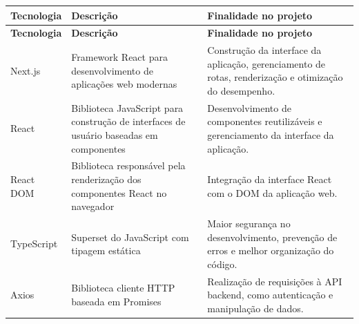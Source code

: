 \documentclass[12pt]{article}
\begin{document}
\begin{longtable}{|p{3cm}|p{4.2cm}|p{7cm}|}
  \hline
  \textbf{Tecnologia}                                                                    & \textbf{Descrição} & \textbf{Finalidade no projeto} \\
  \hline
  \endfirsthead

  \hline
  \textbf{Tecnologia}                                                                    & \textbf{Descrição} & \textbf{Finalidade no projeto} \\
  \hline
  \endhead

  Next.js                                                                                &
  Framework React para desenvolvimento de aplicações web modernas                        &
  Construção da interface da aplicação, gerenciamento de rotas, renderização e otimização do desempenho.                                       \\
  \hline

  React                                                                                  &
  Biblioteca JavaScript para construção de interfaces de usuário baseadas em componentes &
  Desenvolvimento de componentes reutilizáveis e gerenciamento da interface da aplicação.                                                      \\
  \hline

  React DOM                                                                              &
  Biblioteca responsável pela renderização dos componentes React no navegador            &
  Integração da interface React com o DOM da aplicação web.                                                                                    \\
  \hline

  TypeScript                                                                             &
  Superset do JavaScript com tipagem estática                                            &
  Maior segurança no desenvolvimento, prevenção de erros e melhor organização do código.                                                       \\
  \hline

  Axios                                                                                  &
  Biblioteca cliente HTTP baseada em Promises                                            &
  Realização de requisições à API backend, como autenticação e manipulação de dados.                                                           \\
  \hline


\end{longtable}
\end{document}
